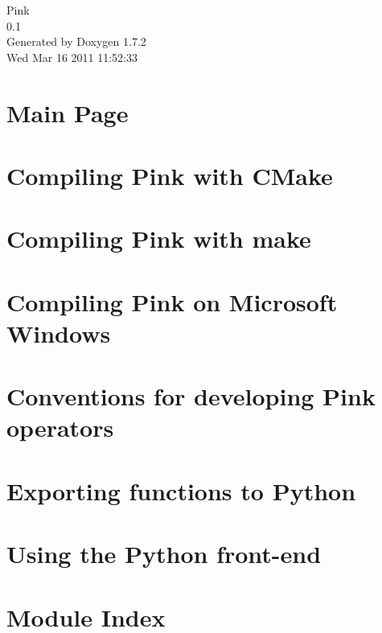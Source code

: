 \documentclass[a4paper]{book}
\begin{document}
\begin{titlepage}
\vspace*{7cm}
\begin{center}
{\Large Pink \\[1ex]\large 0.1 }\\
\vspace*{1cm}
{\large Generated by Doxygen 1.7.2}\\
\vspace*{0.5cm}
{\small Wed Mar 16 2011 11:52:33}\\
\end{center}
\end{titlepage}
\clearemptydoublepage
{}
\tableofcontents
\clearemptydoublepage
{}
\chapter{Main Page}
\label{index}

\chapter{Compiling Pink with CMake}
\label{compiling_cmake}

\chapter{Compiling Pink with make}
\label{compiling_make}

\chapter{Compiling Pink on Microsoft Windows}
\label{compiling_windows}

\chapter{Conventions for developing Pink operators}
\label{dev_conventions}

\chapter{Exporting functions to Python}
\label{python_export}

\chapter{Using the Python front-\/end}
\label{using_python}

\chapter{Module Index}

\end{document}
